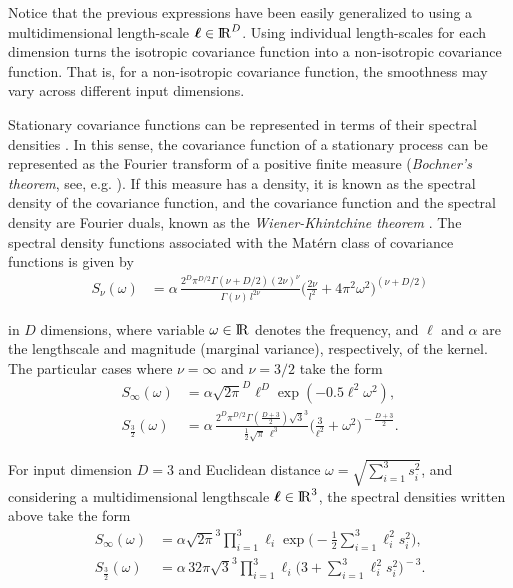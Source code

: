 \documentclass[onecolumn,a4paper,11pt]{article}
\begin{document}
\noindent Notice that the previous expressions have been easily generalized to using a multidimensional length-scale $\bm{\ell}\in {\rm I\!R}^D$. Using individual length-scales for each dimension turns the isotropic covariance function into a non-isotropic covariance function. That is, for a non-isotropic covariance function, the smoothness may vary across different input dimensions. 

Stationary covariance functions can be represented in terms of their spectral densities \citep{rasmussen2006gaussian}. In this sense, the covariance function of a stationary process can be represented as the Fourier transform of a positive finite measure (\textit{Bochner's theorem}, see, e.g. \cite{akhiezer1993theory}). If this measure has a density, it is known as the spectral density of the covariance function, and the covariance function and the spectral density are Fourier duals, known as the \textit{Wiener-Khintchine theorem} \citep{rasmussen2006gaussian}. The spectral density functions associated with the Mat\'ern class of covariance functions is given by
%
\begin{align*}
S_{\nu}(\omega)&= \alpha \, \frac{2^D\pi^{D/2}\Gamma(\nu+D/2)(2\nu)^{\nu}}{\Gamma(\nu)\, l^{2\nu}}\Big(\frac{2\nu}{l^2}+4\pi^2\omega^2 \Big)^{\!(\nu+D/2)}
\end{align*}

\noindent in $D$ dimensions, where variable $\omega\in {\rm I\!R}$ denotes the frequency, and $\ell$ and $\alpha$ are the lengthscale and magnitude (marginal variance), respectively, of the kernel. The particular cases where $\nu=\infty$ and $\nu=3/2$ take the form
%
\begin{align}
S_{\infty}(\omega)&= \alpha \sqrt{2\pi}^D  \ell^D \exp(-0.5 \ell^2 \omega^2), \label{eq_specdens_inf}  \\
S_{\frac{3}{2}}(\omega)&= \alpha \, \frac{2^D\pi^{D/2}\Gamma(\frac{D+3}{2})\sqrt{3}^3}{\frac{1}{2}\sqrt{\pi}\,\ell^3}\Big(\frac{3}{\ell^2}+\omega^2 \Big)^{\!-\frac{D+3}{2}}. \label{eq_specdens_32} 
\end{align}

\noindent For input dimension $D=3$ and Euclidean distance $\omega=\sqrt{\sum_{i=1}^{3}s_i^2}$, and considering a multidimensional lengthscale $\bm{\ell} \in {\rm I\!R}^{3}$, the spectral densities written above take the form
%
\begin{align*}
S_{\infty}(\omega)&= \alpha \sqrt{2\pi}^{3}  \prod_{i=1}^{3} \ell_i  \exp\!\!\big(\!-\frac{1}{2} \sum_{i=1}^{3} \ell_i^2 s_i^2 \big),   \\
S_{\frac{3}{2}}(\omega)&= \alpha \, 32\pi\sqrt{3}^3\prod_{i=1}^{3}\ell_i\big(3+\sum_{i=1}^{3}\ell_i^2 s_i^2 \big)^{\!-3}.
\end{align*}
\end{document}
